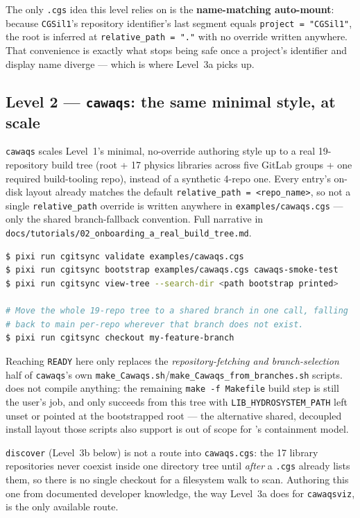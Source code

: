 The only \texttt{.cgs} idea this level relies on is the
\textbf{name-matching auto-mount}: because \texttt{CGSil1}'s repository
identifier's last segment equals \texttt{project = "CGSil1"}, the root is
inferred at \texttt{relative\_path = "."} with no override written anywhere.
That convenience is exactly what stops being safe once a project's
identifier and display name diverge --- which is where Level~3a picks up.

\subsection{Level 2 --- \texttt{cawaqs}: the same minimal style, at scale}

\texttt{cawaqs} scales Level~1's minimal, no-override authoring style up to
a real 19-repository build tree (root + 17 physics libraries across five
GitLab groups + one required build-tooling repo), instead of a synthetic
4-repo one. Every entry's on-disk layout already matches the default
\texttt{relative\_path = <repo\_name>}, so not a single \texttt{relative\_path}
override is written anywhere in \texttt{examples/cawaqs.cgs} --- only the
shared branch-fallback convention. Full narrative in
\texttt{docs/tutorials/02\_onboarding\_a\_real\_build\_tree.md}.

\begin{lstlisting}[language=bash]
$ pixi run cgitsync validate examples/cawaqs.cgs
$ pixi run cgitsync bootstrap examples/cawaqs.cgs cawaqs-smoke-test
$ pixi run cgitsync view-tree --search-dir <path bootstrap printed>

# Move the whole 19-repo tree to a shared branch in one call, falling
# back to main per-repo wherever that branch does not exist.
$ pixi run cgitsync checkout my-feature-branch
\end{lstlisting}

Reaching \texttt{READY} here only replaces the \emph{repository-fetching and
branch-selection} half of \texttt{cawaqs}'s own
\texttt{make\_Cawaqs.sh}/\texttt{make\_Cawaqs\_from\_branches.sh} scripts.
\cgspkg{} does not compile anything: the remaining
\texttt{make -f Makefile} build step is still the user's job, and only
succeeds from this tree with \texttt{LIB\_HYDROSYSTEM\_PATH} left unset or
pointed at the bootstrapped root --- the alternative shared, decoupled
install layout those scripts also support is out of scope for \cgspkg{}'s
containment model.

\texttt{discover} (Level~3b below) is not a route into \texttt{cawaqs.cgs}:
the 17 library repositories never coexist inside one directory tree until
\emph{after} a \texttt{.cgs} already lists them, so there is no single
checkout for a filesystem walk to scan. Authoring this one from documented
developer knowledge, the way Level~3a does for \texttt{cawaqsviz}, is the
only available route.

